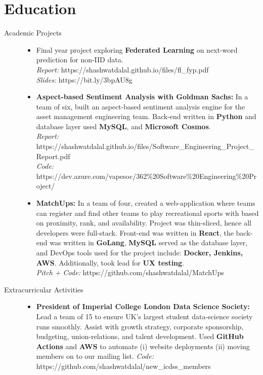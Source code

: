 \documentclass[a4paper]{deedy-resume} %
\begin{document}
\section{Education}
    \begin{description}
        \item[Academic Projects] \hspace{7.5cm}
            \begin{itemize}
                \item Final year project exploring \textbf{Federated Learning} on next-word prediction for non-IID data. \\
                \textit{Report: } https://shashwatdalal.github.io/files/fl\_fyp.pdf \\
                \textit{Slides: } https://bit.ly/3bpAU8g
                \item \textbf{Aspect-based Sentiment Analysis with Goldman Sachs:} In a team of six, built an aspect-based sentiment analysis engine for the asset management engineering team. Back-end written in \textbf{Python} and database layer used \textbf{MySQL}, and \textbf{Microsoft Cosmos}. \\
                \textit{Report:} https://shashwatdalal.github.io/files/Software\_Engineering\_Project\_Report.pdf \\ \textit{Code:} https://dev.azure.com/vapesoc/362\%20Software\%20Engineering\%20Project/
                \item \textbf{MatchUps:} In a team of four, created a web-application where teams can register and find other teams to play recreational sports with based on proximity, rank, and availability. Project was thin-sliced, hence all developers were full-stack. Front-end was written in \textbf{React}, the back-end was written in \textbf{GoLang}, \textbf{MySQL} served as the database layer, and DevOps tools used for the project include: \textbf{Docker, Jenkins, AWS}. Additionally, took lead for \textbf{UX testing}. \\
                \textit{Pitch + Code:} https://github.com/shashwatdalal/MatchUps
        \end{itemize}
         \item[Extracurricular Activities] \hspace{7.5cm}
            \begin{itemize}
                \item \textbf{President of Imperial College London Data Science Society:} Lead a team of 15 to ensure UK's largest student data-science society runs smoothly. Assist with growth strategy, corporate sponsorship, budgeting, union-relations, and talent development. Used \textbf{GitHub Actions} and \textbf{AWS} to automate (i) website deployments (ii) moving members on to our mailing list.
                \textit{Code:} https://github.com/shashwatdalal/new\_icdss\_members
        \end{itemize}
    \end{description}
\end{document}
